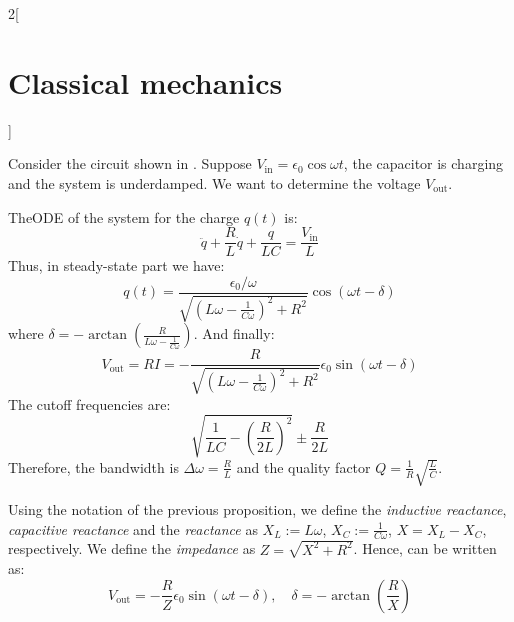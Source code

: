 \documentclass[../../../main_physics.tex]{subfiles}
\begin{document}
\begin{multicols}{2}[\section{Classical mechanics}]
\begin{proposition}
    Consider the circuit shown in . Suppose $V_\text{in}=\epsilon_0\cos\omega t$, the capacitor is charging and the system is underdamped. We want to determine the voltage $V_\text{out}$.
    \begin{center}
      \begin{minipage}{\linewidth}
        \centering
        
        \label{CM_RLC-genS}
      \end{minipage}
    \end{center}
    TheODE of the system for the charge $q(t)$ is: $$\ddot{q}+\frac{R}{L}\dot{q}+\frac{q}{LC}=\frac{V_\text{in}}{L}$$ Thus, in steady-state part we have: $$q(t)=\frac{\epsilon_0/\omega}{\sqrt{{\left(L\omega-\frac{1}{C\omega}\right)}^2+R^2}}\cos(\omega t-\delta)$$ where $\delta=-\arctan\left(\frac{R}{L\omega-\frac{1}{C\omega}}\right)$.
    And finally:
    \begin{equation}\label{CM_Vout}
      V_\text{out}=RI=-\frac{R}{\sqrt{{\left(L\omega-\frac{1}{C\omega}\right)}^2+R^2}}\epsilon_0\sin(\omega t-\delta)
    \end{equation}
    The cutoff frequencies are: $$\sqrt{\frac{1}{LC}-{\left(\frac{R}{2L}\right)}^2}\pm\frac{R}{2L}$$
    Therefore, the bandwidth is $\Delta\omega=\frac{R}{L}$ and the quality factor $Q=\frac{1}{R}\sqrt{\frac{L}{C}}$.
  \end{proposition}
  \begin{definition}
    Using the notation of the previous proposition, we define the \emph{inductive reactance}, \emph{capacitive reactance} and the \emph{reactance} as $X_L:=L\omega$, $X_C:=\frac{1}{C\omega}$, $X=X_L-X_C$, respectively. We define the \emph{impedance} as $Z=\sqrt{X^2+R^2}$. Hence,  can be written as: $$V_\text{out}=-\frac{R}{Z}\epsilon_0\sin(\omega t-\delta),\quad\delta=-\arctan\left(\frac{R}{X}\right)$$
  \end{definition}

\end{multicols}
\end{document}
